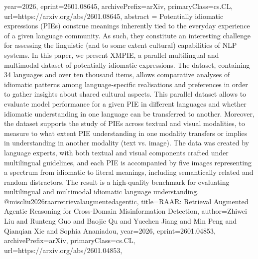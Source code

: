 {      year={2026},
      eprint={2601.08645},
      archivePrefix={arXiv},
      primaryClass={cs.CL},
      url={https://arxiv.org/abs/2601.08645},
      abstract = {Potentially idiomatic expressions (PIEs) construe meanings inherently tied to the everyday experience of a given language community. As such, they constitute an interesting challenge for assessing the linguistic (and to some extent cultural) capabilities of NLP systems. In this paper, we present XMPIE, a parallel multilingual and multimodal dataset of potentially idiomatic expressions. The dataset, containing 34 languages and over ten thousand items, allows comparative analyses of idiomatic patterns among language-specific realisations and preferences in order to gather insights about shared cultural aspects. This parallel dataset allows to evaluate model performance for a given PIE in different languages and whether idiomatic understanding in one language can be transferred to another. Moreover, the dataset supports the study of PIEs across textual and visual modalities, to measure to what extent PIE understanding in one modality transfers or implies in understanding in another modality (text vs. image). The data was created by language experts, with both textual and visual components crafted under multilingual guidelines, and each PIE is accompanied by five images representing a spectrum from idiomatic to literal meanings, including semantically related and random distractors. The result is a high-quality benchmark for evaluating multilingual and multimodal idiomatic language understanding.}
}@misc{liu2026raarretrievalaugmentedagentic,
      title={RAAR: Retrieval Augmented Agentic Reasoning for Cross-Domain Misinformation Detection}, 
      author={Zhiwei Liu and Runteng Guo and Baojie Qu and Yuechen Jiang and Min Peng and Qianqian Xie and Sophia Ananiadou},
      year={2026},
      eprint={2601.04853},
      archivePrefix={arXiv},
      primaryClass={cs.CL},
      url={https://arxiv.org/abs/2601.04853},
}
